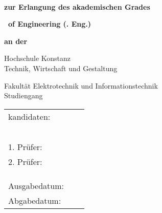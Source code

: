 \begin{titlepage}

\AddToShipoutPicture*{\BackgroundImgTitelPage}

\vspace*{\bigskipamount}


{\makeatletter
\fboxsep=0pt
\colorbox{htwg-white}{\begin{minipage}[t]{145mm}
    \begin{flushleft}
        \color{htwg-teal}\Large {\@report@typetext}
        \\
        \color{htwg-teal}\Large \textbf{\@title}
    \end{flushleft}
\end{minipage}}
\makeatother}

\bigskip
\bigskip

{
\setlength{\parskip}{0.5cm}
\begin{center}
	\textbf{zur Erlangung des akademischen Grades}
	
	\textbf{\Large \type\ of Engineering (\typeshortcut. Eng.)}
	
	\textbf{an der}
	
	\textsf{\huge Hochschule Konstanz}\\
	{\small Technik, Wirtschaft und Gestaltung}
	
    \textsf{\Large Fakultät Elektrotechnik und Informationstechnik} \\
	Studiengang \studiengangB
	
\end{center}
}

\bigskip
\bigskip
\bigskip

\begin{center}
	\begingroup
	\renewcommand*{\arraystretch}{1}
	{\makeatletter
		\begin{tabular}{lll}
			\type kandidaten: & \verfasserB \\
							& \strasseB \\
							& \wohnortB \\ \\ \\ \\
	
			1. Prüfer: & \prueferA \\
			2. Prüfer: & \prueferB \\ \\ \\ \\
			
			Ausgabedatum: & \ausgabedatum \\
			Abgabedatum: & \abgabedatum
		\end{tabular}
		\makeatother}
	\endgroup
\end{center}


\end{titlepage}


